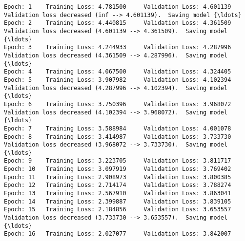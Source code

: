 \documentclass[11pt]{article}
\begin{document}
    \begin{Verbatim}[commandchars=\\\{\}]
Epoch: 1 	Training Loss: 4.781500 	Validation Loss: 4.601139
Validation loss decreased (inf --> 4.601139).  Saving model {\ldots}
Epoch: 2 	Training Loss: 4.440815 	Validation Loss: 4.361509
Validation loss decreased (4.601139 --> 4.361509).  Saving model {\ldots}
Epoch: 3 	Training Loss: 4.244933 	Validation Loss: 4.287996
Validation loss decreased (4.361509 --> 4.287996).  Saving model {\ldots}
Epoch: 4 	Training Loss: 4.067500 	Validation Loss: 4.324405
Epoch: 5 	Training Loss: 3.907982 	Validation Loss: 4.102394
Validation loss decreased (4.287996 --> 4.102394).  Saving model {\ldots}
Epoch: 6 	Training Loss: 3.750396 	Validation Loss: 3.968072
Validation loss decreased (4.102394 --> 3.968072).  Saving model {\ldots}
Epoch: 7 	Training Loss: 3.588984 	Validation Loss: 4.001078
Epoch: 8 	Training Loss: 3.414987 	Validation Loss: 3.733730
Validation loss decreased (3.968072 --> 3.733730).  Saving model {\ldots}
Epoch: 9 	Training Loss: 3.223705 	Validation Loss: 3.811717
Epoch: 10 	Training Loss: 3.097919 	Validation Loss: 3.769402
Epoch: 11 	Training Loss: 2.908973 	Validation Loss: 3.800385
Epoch: 12 	Training Loss: 2.714174 	Validation Loss: 3.788274
Epoch: 13 	Training Loss: 2.567910 	Validation Loss: 3.863041
Epoch: 14 	Training Loss: 2.399887 	Validation Loss: 3.839105
Epoch: 15 	Training Loss: 2.184856 	Validation Loss: 3.653557
Validation loss decreased (3.733730 --> 3.653557).  Saving model {\ldots}
Epoch: 16 	Training Loss: 2.027077 	Validation Loss: 3.842007

    \end{Verbatim}
\end{document}
